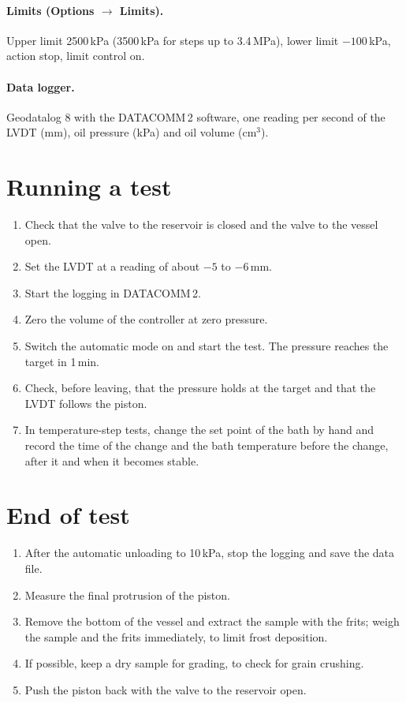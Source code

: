 \paragraph{Limits (Options $\to$ Limits).} Upper limit 2500\,kPa (3500\,kPa for steps up to 3.4\,MPa), lower limit $-100$\,kPa, action stop, limit control on.

\paragraph{Data logger.} Geodatalog 8 with the DATACOMM\,2 software, one reading per second of the LVDT (mm), oil pressure (kPa) and oil volume (cm$^3$).

\section{Running a test}
\begin{enumerate}
    \item Check that the valve to the reservoir is closed and the valve to the vessel open.
    \item Set the LVDT at a reading of about $-5$ to $-6$\,mm.
    \item Start the logging in DATACOMM\,2.
    \item Zero the volume of the controller at zero pressure.
    \item Switch the automatic mode on and start the test. The pressure reaches the target in 1\,min.
    \item Check, before leaving, that the pressure holds at the target and that the LVDT follows the piston.
    \item In temperature-step tests, change the set point of the bath by hand and record the time of the change and the bath temperature before the change, after it and when it becomes stable.
\end{enumerate}

\section{End of test}
\begin{enumerate}
    \item After the automatic unloading to 10\,kPa, stop the logging and save the data file.
    \item Measure the final protrusion of the piston.
    \item Remove the bottom of the vessel and extract the sample with the frits; weigh the sample and the frits immediately, to limit frost deposition.
    \item If possible, keep a dry sample for grading, to check for grain crushing.
    \item Push the piston back with the valve to the reservoir open.
\end{enumerate}
